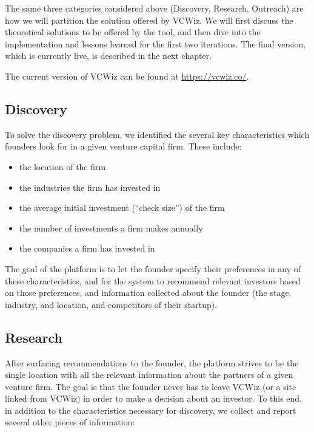 The same three categories considered above (Discovery, Research, Outreach) are how we will partition the solution offered by VCWiz. We will first discuss the theoretical solutions to be offered by the tool, and then dive into the implementation and lessons learned for the first two iterations. The final version, which is currently live, is described in the next chapter.

The current version of VCWiz can be found at \url{https://vcwiz.co/}.

\subsection{Discovery}

To solve the discovery problem, we identified the several key characteristics which founders look for in a given venture capital firm. These include:

\begin{itemize}
  \item the location of the firm
  \item the industries the firm has invested in
  \item the average initial investment (``check size'') of the firm
  \item the number of investments a firm makes annually
  \item the companies a firm has invested in
\end{itemize}

The goal of the platform is to let the founder specify their preferences in any of these characteristics, and for the system to recommend relevant investors based on those preferences, and information collected about the founder (the stage, industry, and location, and competitors of their startup).

\subsection{Research}

After surfacing recommendations to the founder, the platform strives to be the single location with all the relevant information about the partners of a given venture firm. The goal is that the founder never has to leave VCWiz (or a site linked from VCWiz) in order to make a decision about an investor. To this end, in addition to the characteristics necessary for discovery, we collect and report several other pieces of information:

